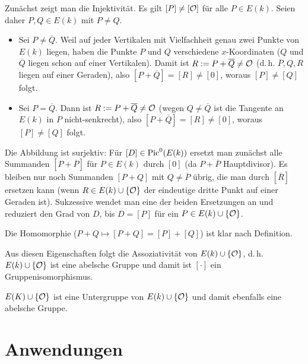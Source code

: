 \begin{Beweis}
    Zunächst zeigt man die Injektivität.
    Es gilt $[P] \not= [\mathcal{O}]$ für alle $P \in E(k)$.
    Seien daher $P, Q \in E(k)$ mit $P \not= Q$.
    \begin{itemize}
        \item
        Sei $P \not= \overline{Q}$.
        Weil auf jeder Vertikalen mit Vielfachheit genau zwei Punkte von $E(k)$ liegen,
        haben die Punkte $P$ und $Q$ verschiedene $x$-Koordinaten
        ($Q$ und $\overline{Q}$ liegen schon auf einer Vertikalen).
        Damit ist $R := P + \overline{Q} \not= \mathcal{O}$
        (d.\,h. $\overline{P}, Q, R$ liegen auf einer Geraden),
        also $[P + \overline{Q}] = [R] \not= [0]$, woraus $[P] \not= [Q]$ folgt.

        \item
        Sei $P = \overline{Q}$.
        Dann ist $R := P + \overline{Q} \not= \mathcal{O}$
        (wegen $Q \not= \overline{Q}$ ist die Tangente an $E(k)$ in $P$ nicht-senkrecht),
        also $[P + \overline{Q}] = [R] \not= [0]$, woraus $[P] \not= [Q]$ folgt.
    \end{itemize}
    Die Abbildung ist surjektiv:
    Für $[D] \in \operatorname{Pic}^0(E(k))$ ersetzt man zunächst alle Summanden $[P + \overline{P}]$ für
    $P \in E(k)$ durch $[0]$ (da $P + \overline{P}$ Hauptdivisor).
    Es bleiben nur noch Summanden $[P + Q]$ mit $Q \not= \overline{P}$ übrig,
    die man durch $[\overline{R}]$ ersetzen kann (wenn $R \in E(k) \cup \{\mathcal{O}\}$ der eindeutige
    dritte Punkt auf einer Geraden ist).
    Sukzessive wendet man eine der beiden Ersetzungen an und reduziert den Grad von $D$,
    bis $D = [P]$ für ein $P \in E(k) \cup \{\mathcal{O}\}$.

    Die Homomorphie ($P + Q \mapsto [P + Q] = [P] + [Q]$) ist klar nach Definition.

    Aus diesen Eigenschaften folgt die Assoziativität von $E(k) \cup \{\mathcal{O}\}$, d.\,h.
    $E(k) \cup \{\mathcal{O}\}$ ist eine abelsche Gruppe und damit ist $[\cdot]$ ein Gruppenisomorphismus.
\end{Beweis}

\linie

$E(K) \cup \{\mathcal{O}\}$ ist eine Untergruppe von $E(k) \cup \{\mathcal{O}\}$ und damit ebenfalls eine
abelsche Gruppe.

\pagebreak

\section{%
    Anwendungen%
}

